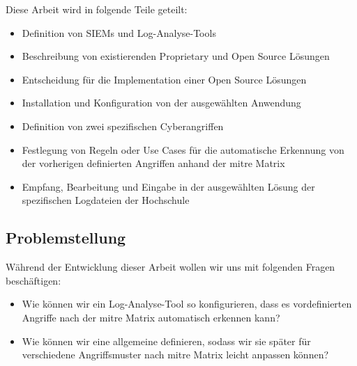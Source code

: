 Diese Arbeit wird in folgende Teile geteilt: 





{
\begin{itemize}[noitemsep]
   \item	Definition von SIEMs und Log-Analyse-Tools 
   \item	Beschreibung von existierenden Proprietary und Open Source Lösungen 
   \item	Entscheidung für die Implementation einer Open Source Lösungen 
   \item	Installation und Konfiguration von der ausgewählten Anwendung 
   \item	Definition von zwei spezifischen Cyberangriffen 
   \item	Festlegung von Regeln oder Use Cases für die automatische Erkennung von der vorherigen definierten Angriffen anhand der \gls{mitre} Matrix 
   \item	Empfang, Bearbeitung und Eingabe in der ausgewählten Lösung der spezifischen Logdateien der Hochschule 
\end{itemize}
}

\subsection{Problemstellung}
Während der Entwicklung dieser Arbeit wollen wir uns mit folgenden Fragen beschäftigen: 

{
\begin{itemize}[noitemsep]
   \item Wie können wir ein Log-Analyse-Tool so konfigurieren, dass es vordefinierten Angriffe nach der \gls{mitre} Matrix automatisch erkennen kann? 
   \item Wie können wir eine allgemeine  definieren, sodass wir sie später für verschiedene Angriffsmuster nach \gls{mitre} Matrix leicht anpassen können?
\end{itemize}
}

